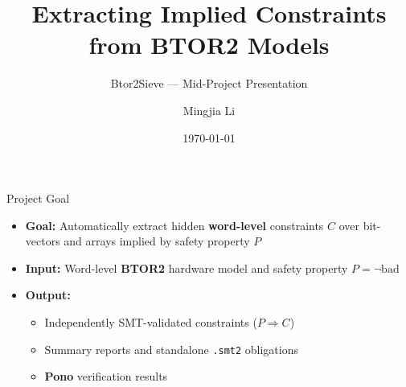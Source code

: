 \documentclass[aspectratio=169,xcolor=dvipsnames]{beamer}
\title{Extracting Implied Constraints from BTOR2 Models}
\subtitle{Btor2Sieve --- Mid-Project Presentation}
\author{Mingjia Li}
\institute{}
\date{\today}
\begin{document}

\begin{frame}
  \titlepage
\end{frame}


\begin{frame}{Project Goal}

  \begin{itemize}
      \setlength\itemsep{0.9em}
    \item \textbf{Goal:} Automatically extract hidden \textbf{word-level} constraints $C$ over bit-vectors and arrays implied by safety property $P$
    \item \textbf{Input:} Word-level \textbf{BTOR2} hardware model and safety property $P = \neg \text{bad}$
    \item \textbf{Output:}
      \begin{itemize}\normalsize
          \setlength\itemsep{0.35em}
        \item Independently SMT-validated constraints ($P \Rightarrow C$)
        \item Summary reports and standalone \texttt{.smt2} obligations
        \item \textbf{Pono} verification results 
      \end{itemize}
  \end{itemize}

\end{frame}

\end{document}
